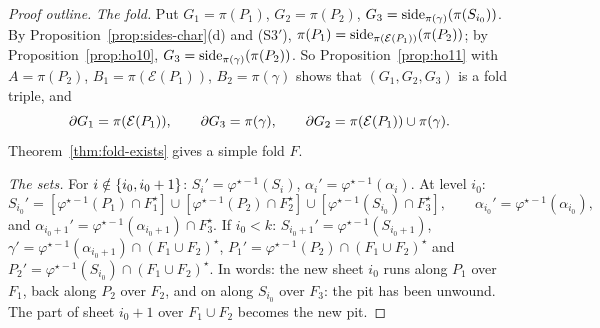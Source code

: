 
\begin{proof}[Proof outline]
\emph{The fold.} Put $G_1=\pi(P_1)$, $G_2=\pi(P_2)$, $G_3=\operatorname{side}_{\pi(\gamma)}(\pi(S_{i_0}))$. By Proposition~\ref{prop:sides-char}(d) and (S3$'$), $\pi(P_1)=\operatorname{side}_{\pi(\mathcal E(P_1))}(\pi(P_2))$; by
Proposition~\ref{prop:ho10}, $G_3=\operatorname{side}_{\pi(\gamma)}(\pi(P_2))$. So Proposition~\ref{prop:ho11} with $A=\pi(P_2)$, $B_1=\pi(\mathcal E(P_1))$, $B_2=\pi(\gamma)$ shows that $(G_1,G_2,G_3)$ is a fold triple,
and
\begin{equation}\label{eq:19-frontiers}
\partial G_1=\pi(\mathcal E(P_1)),\qquad \partial G_3=\pi(\gamma),\qquad \partial G_2=\pi(\mathcal E(P_1))\cup\pi(\gamma).
\end{equation}
Theorem~\ref{thm:fold-exists} gives a simple fold $F$.

\emph{The sets.} For $i\notin\left\{ i_0,i_0+1 \right\}$: $S_i'=\varphi^{\star-1}(S_i)$, $\alpha_i'=\varphi^{\star-1}(\alpha_i)$. At level $i_0$:
\[
S_{i_0}'=[\varphi^{\star-1}(P_1)\cap F_1^\star]\cup[\varphi^{\star-1}(P_2)\cap F_2^\star]\cup[\varphi^{\star-1}(S_{i_0})\cap F_3^\star],\qquad \alpha_{i_0}'=\varphi^{\star-1}(\alpha_{i_0}),
\]
and $\alpha_{i_0+1}'=\varphi^{\star-1}(\alpha_{i_0+1})\cap F_3^\star$. If $i_0<k$: $S_{i_0+1}'=\varphi^{\star-1}(S_{i_0+1})$, $\gamma'=\varphi^{\star-1}(\alpha_{i_0+1})\cap(F_1\cup F_2)^\star$,
$P_1'=\varphi^{\star-1}(P_2)\cap(F_1\cup F_2)^\star$ and $P_2'=\varphi^{\star-1}(S_{i_0})\cap(F_1\cup F_2)^\star$. In words: the new sheet $i_0$ runs along $P_1$ over $F_1$, back along $P_2$ over $F_2$, and
on along $S_{i_0}$ over $F_3$: the pit has been unwound. The part of sheet $i_0+1$ over $F_1\cup F_2$ becomes the new pit.


\end{proof}
